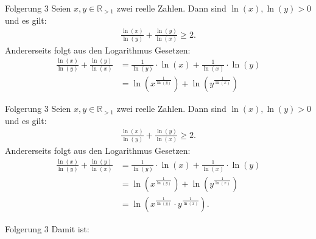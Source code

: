 \documentclass[10pt]{beamer}
\def\bR{\mathbb{R}}
\begin{document}
\begin{frame}{Folgerung 3}
    Seien \( x, y \in \bR_{> 1} \) zwei reelle Zahlen. Dann sind \( \ln\left( x \right), \ln\left( y \right) > 0 \) und es gilt:
    \begin{align*}
        \frac{\ln\left( x \right)}{\ln\left( y \right)} + \frac{\ln\left( y \right)}{\ln\left( x \right)} 
        \geq 2.
    \end{align*}
    Andererseits folgt aus den Logarithmus Gesetzen:
    \begin{align*}
        \frac{\ln\left( x \right)}{\ln\left( y \right)} + \frac{\ln\left( y \right)}{\ln\left( x \right)} 
        & = \frac{1}{\ln\left( y \right)} \cdot \ln\left( x \right) + \frac{1}{\ln\left( x \right)} \cdot \ln\left( y \right) \\
        & = \ln\left( x^{\frac{1}{\ln\left( y \right)}} \right) + \ln\left( y^{\frac{1}{\ln\left( x \right)}} \right)
    \end{align*}
\end{frame}



\begin{frame}{Folgerung 3}
    Seien \( x, y \in \bR_{> 1} \) zwei reelle Zahlen. Dann sind \( \ln\left( x \right), \ln\left( y \right) > 0 \) und es gilt:
    \begin{align*}
        \frac{\ln\left( x \right)}{\ln\left( y \right)} + \frac{\ln\left( y \right)}{\ln\left( x \right)} 
        \geq 2.
    \end{align*}
    Andererseits folgt aus den Logarithmus Gesetzen:
    \begin{align*}
        \frac{\ln\left( x \right)}{\ln\left( y \right)} + \frac{\ln\left( y \right)}{\ln\left( x \right)} 
        & = \frac{1}{\ln\left( y \right)} \cdot \ln\left( x \right) + \frac{1}{\ln\left( x \right)} \cdot \ln\left( y \right) \\
        & = \ln\left( x^{\frac{1}{\ln\left( y \right)}} \right) + \ln\left( y^{\frac{1}{\ln\left( x \right)}} \right) \\
        & = \ln\left( x^{\frac{1}{\ln\left( y \right)}} \cdot y^{\frac{1}{\ln\left( x \right)}} \right).
    \end{align*}
\end{frame}



\begin{frame}{Folgerung 3}
    Damit ist:
\end{frame}
\end{document}

